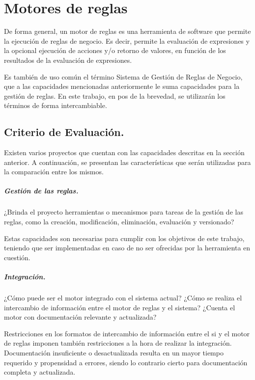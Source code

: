 \chapter{Motores de reglas}
De forma general, un motor de reglas es una herramienta de software que permite la ejecución de reglas de negocio. Es decir, permite la evaluación de expresiones y la opcional ejecución de acciones y/o retorno de valores, en función de los resultados de la evaluación de expresiones.

Es también de uso común el término Sistema de Gestión de Reglas de Negocio, que a las capacidades mencionadas anteriormente le suma capacidades para la gestión de reglas. En este trabajo, en pos de la brevedad, se utilizarán los términos de forma intercambiable.

\section{Criterio de Evaluación.}
Existen varios proyectos que cuentan con las capacidades descritas en la sección anterior. A continuación, se presentan las características que serán utilizadas para la comparación entre los mismos.

\paragraph{Gestión de las reglas.}
¿Brinda el proyecto herramientas o mecanismos para tareas de la gestión de las reglas, como la creación, modificación, eliminación, evaluación y versionado?

Estas capacidades son necesarias para cumplir con los objetivos de este trabajo, teniendo que ser implementadas en caso de no ser ofrecidas por la herramienta en cuestión.

\paragraph{Integración.}
¿Cómo puede ser el motor integrado con el sistema actual? ¿Cómo se realiza el intercambio de información entre el motor de reglas y el sistema? ¿Cuenta el motor con documentación relevante y actualizada?

Restricciones en los formatos de intercambio de información entre el \acrshort{si} y el motor de reglas imponen también restricciones a la hora de realizar la integración.
Documentación insuficiente o desactualizada resulta en un mayor tiempo requerido y propensidad a errores, siendo lo contrario cierto para documentación completa y actualizada.

